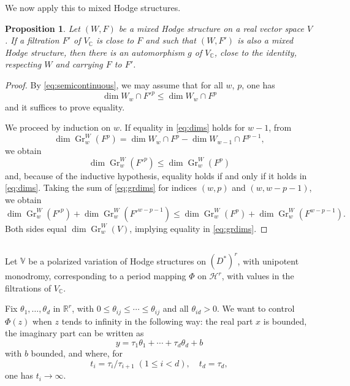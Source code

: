 \documentclass[11pt,a4paper]{article}
\theoremstyle{plain}
\newtheorem{proposition}[theorem]{Proposition}
\theoremstyle{definition}
\DeclareMathOperator{\Gr}{Gr}
\begin{document}
We now apply this to mixed Hodge structures.

\begin{proposition}\label{prop:mixedhodge}
Let $(W,F)$ be a mixed Hodge structure on a real vector space $V$. If a filtration $F'$ of $V_{\mathbb{C}}$ is close to $F$ and such that $(W,F')$ is also a mixed Hodge structure, then there is an automorphism $g$ of $V_{\mathbb{C}}$, close to the identity, respecting $W$ and carrying $F$ to $F'$.
\end{proposition}

\begin{proof}
By \eqref{eq:semicontinuous}, we may assume that for all $w$, $p$, one has
\begin{equation}\label{eq:dims}
\dim W_w\cap F'^p\leq\dim W_w\cap F^p
\end{equation}
and it suffices to prove equality.

We proceed by induction on $w$. If equality in \eqref{eq:dims} holds for $w-1$, from
\[
\dim\Gr_w^W(F^p)=\dim W_w\cap F^p-\dim W_{w-1}\cap F^{p-1},
\]
we obtain
\begin{equation}\label{eq:grdims}
\dim\Gr_w^W(F'^p)\leq\dim\Gr_w^W(F^p)
\end{equation}
and, because of the inductive hypothesis, equality holds if and only if it holds in \eqref{eq:dims}. Taking the sum of \eqref{eq:grdims} for indices $(w,p)$ and $(w,w-p-1)$, we obtain
\[
\dim\Gr_w^W(F'^p)+\dim\Gr_w^W(F'^{w-p-1})\leq\dim\Gr_w^W(F^p)+\dim\Gr_w^W(F^{w-p-1}).
\]
Both sides equal $\dim\Gr_w^W(V)$, implying equality in \eqref{eq:grdims}.
\end{proof}

\subsection{}
Let $\mathbb{V}$ be a polarized variation of Hodge structures on $(D^*)^r$, with unipotent monodromy, corresponding to a period mapping $\Phi$ on $\mathcal{H}^r$, with values in the filtrations of $V_{\mathbb{C}}$.

Fix $\theta_1,\dots,\theta_d$ in $\mathbb{R}^r$, with $0\leq\theta_{ij}\leq\cdots\leq\theta_{ij}$ and all $\theta_{id}>0$. We want to control $\Phi(z)$ when $z$ tends to infinity in the following way: the real part $x$ is bounded, the imaginary part can be written as
\begin{equation}\label{eq:imexpand}
y=\tau_1\theta_1+\cdots+\tau_d\theta_d+b
\end{equation}
with $b$ bounded, and where, for
\begin{equation}\label{eq:tau}
t_i=\tau_i/\tau_{i+1}\;(1\leq i<d),\quad t_d=\tau_d,
\end{equation}
one has $t_i\to\infty$.
\end{document}

